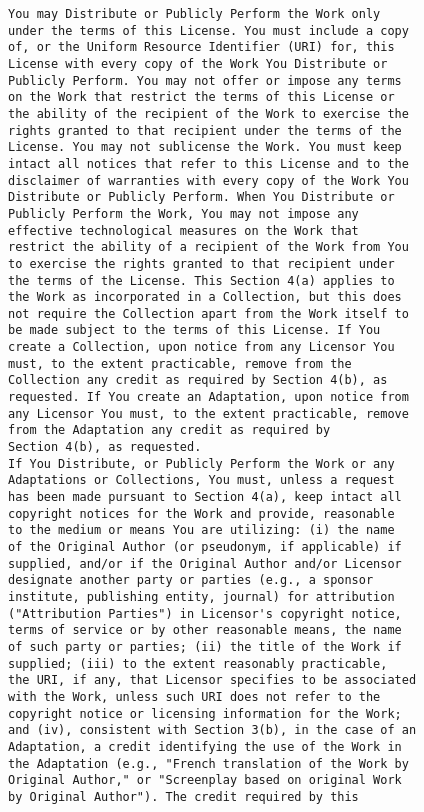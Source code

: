 \begin{verbatim}
You may Distribute or Publicly Perform the Work only
under the terms of this License. You must include a copy
of, or the Uniform Resource Identifier (URI) for, this
License with every copy of the Work You Distribute or
Publicly Perform. You may not offer or impose any terms
on the Work that restrict the terms of this License or
the ability of the recipient of the Work to exercise the
rights granted to that recipient under the terms of the
License. You may not sublicense the Work. You must keep
intact all notices that refer to this License and to the
disclaimer of warranties with every copy of the Work You
Distribute or Publicly Perform. When You Distribute or
Publicly Perform the Work, You may not impose any
effective technological measures on the Work that
restrict the ability of a recipient of the Work from You
to exercise the rights granted to that recipient under
the terms of the License. This Section 4(a) applies to
the Work as incorporated in a Collection, but this does
not require the Collection apart from the Work itself to
be made subject to the terms of this License. If You
create a Collection, upon notice from any Licensor You
must, to the extent practicable, remove from the
Collection any credit as required by Section 4(b), as
requested. If You create an Adaptation, upon notice from
any Licensor You must, to the extent practicable, remove
from the Adaptation any credit as required by
Section 4(b), as requested.
If You Distribute, or Publicly Perform the Work or any
Adaptations or Collections, You must, unless a request
has been made pursuant to Section 4(a), keep intact all
copyright notices for the Work and provide, reasonable
to the medium or means You are utilizing: (i) the name
of the Original Author (or pseudonym, if applicable) if
supplied, and/or if the Original Author and/or Licensor
designate another party or parties (e.g., a sponsor
institute, publishing entity, journal) for attribution
("Attribution Parties") in Licensor's copyright notice,
terms of service or by other reasonable means, the name
of such party or parties; (ii) the title of the Work if
supplied; (iii) to the extent reasonably practicable,
the URI, if any, that Licensor specifies to be associated
with the Work, unless such URI does not refer to the
copyright notice or licensing information for the Work;
and (iv), consistent with Section 3(b), in the case of an
Adaptation, a credit identifying the use of the Work in
the Adaptation (e.g., "French translation of the Work by
Original Author," or "Screenplay based on original Work
by Original Author"). The credit required by this

\end{verbatim}
